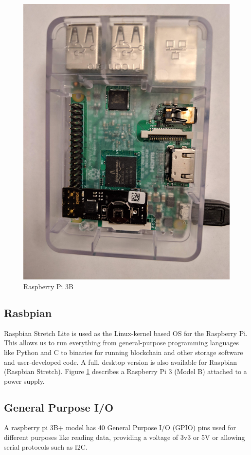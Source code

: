 \documentclass[11pt,openright]{report}
\begin{document}
\begin{figure}
    \centering
    \includegraphics[scale=0.1]{images/rpi.jpg}
    \caption{Raspberry Pi 3B}
    \label{fig:rpi}
\end{figure}


\newpage
\subsection{Rasbpian}
Raspbian Stretch Lite is used as the Linux-kernel based OS for the Raspberry Pi. This allows us to run everything from general-purpose programming languages like Python and C to binaries for running blockchain and other storage software and user-developed code. A full, desktop version is also available for Raspbian (Raspbian Stretch). Figure \ref{fig:rpi} describes a Raspberry Pi 3 (Model B) attached to a power supply.
 
\subsection{General Purpose I/O}
A raspberry pi 3B+ model has 40 General Purpose I/O (GPIO) pins used for different purposes like reading data, providing a voltage of 3v3 or 5V or allowing serial protocols such as I2C.
\end{document}
